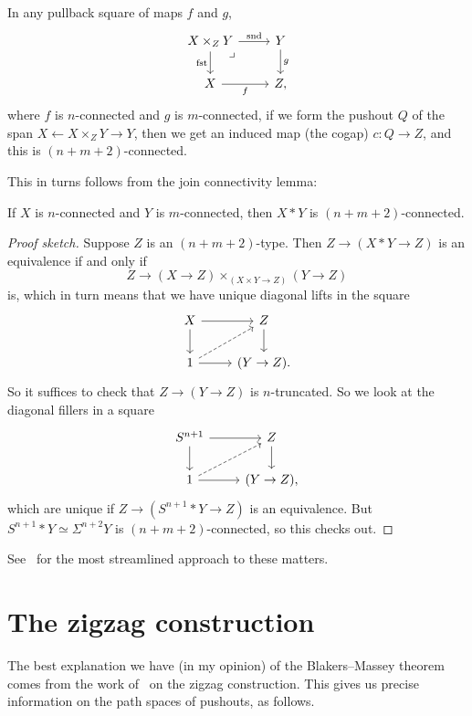 \documentclass[10pt,oneside,leqno,openright]{memoir}
\begin{document}
\begin{theorem}
  \label{thm:dual-BM}
  In any pullback square of maps $f$ and $g$,
  \[
    \begin{tikzcd}
      X\times_ZY \ar[r,"\snd"]\ar[d,"\fst"']\pbcorner & Y\ar[d,"g"] \\
      X \ar[r,"f"'] & Z,
    \end{tikzcd}
  \]
  where $f$ is $n$-connected and $g$ is $m$-connected, if we form the pushout $Q$ of
  the span $X \leftarrow X\times_ZY \to Y$, then we get an induced
  map (the cogap) $c : Q \to Z$, and this is $(n+m+2)$-connected.
\end{theorem}
This in turns follows from the join connectivity lemma:
\begin{lemma}
  \label{lem:join-connectivity}
  If $X$ is $n$-connected and $Y$ is $m$-connected, then $X*Y$ is $(n+m+2)$-connected.
\end{lemma}
\begin{proof}[Proof sketch]
  Suppose $Z$ is an $(n+m+2)$-type.
  Then $Z \to (X*Y \to Z)$ is an equivalence if and only if
  \[Z \to (X \to Z) \times_{(X\times Y \to Z)} (Y \to Z)\]
  is, which in turn means that we have unique diagonal lifts in the square
  \[
    \begin{tikzcd}
      X \ar[r]\ar[d] & Z \ar[d] \\
      1 \ar[r]\ar[ur,dashed] & (Y \to Z).
    \end{tikzcd}
  \]
  So it suffices to check that $Z \to (Y \to Z)$ is $n$-truncated.
  So we look at the diagonal fillers in a square
  \[
    \begin{tikzcd}
      S^{n+1} \ar[r]\ar[d] & Z\ar[d] \\
      1 \ar[r]\ar[ur,dashed] & (Y \to Z),
    \end{tikzcd}
  \]
  which are unique if $Z \to (S^{n+1}*Y \to Z)$ is an equivalence. But
  $S^{n+1}*Y \simeq \Sigma^{n+2}Y$ is $(n+m+2)$-connected, so this checks out.
\end{proof}

See~\textcite{ABFJ-BM} for the most streamlined approach to these matters.

\section*{The zigzag construction}

The best explanation we have (in my opinion) of the Blakers--Massey theorem
comes from the work of~\textcite{Warn2024} on the zigzag construction.
This gives us precise information on the path spaces of pushouts, as follows.
\end{document}
